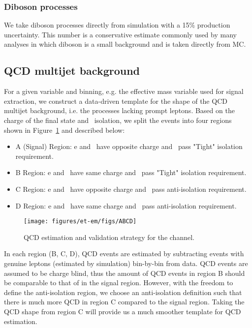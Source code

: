 \subsubsection{Diboson processes}
We take diboson processes directly from simulation with a 15\% production uncertainty. This number is a conservative estimate commonly used by many analyses in which diboson is a small background and is taken directly from MC.

    
\subsection{QCD multijet background}\label{sec:etau_qcd}
For a given variable and binning, e.g. the effective mass variable
used for signal extraction, we construct a data-driven template for
the shape of the QCD multijet background, i.e. the processes lacking
prompt leptons.  Based on the charge of the final state and \tauh ~isolation,
we split the events into four regions shown in Figure~\ref{fig:ABCD} and 
described below:
\begin{itemize}
  \item A (Signal) Region: e and \tauh ~have opposite charge and \tauh ~pass "Tight" isolation requirement.
  \item B Region: e and \tauh ~have same charge and ~\tauh pass "Tight" isolation requirement.
  \item C Region: e and \tauh ~have opposite charge and \tauh ~pass anti-isolation requirement.
  \item D Region: e and \tauh ~have same charge and \tauh ~pass anti-isolation requirement.
\end{itemize}

\begin{figure}[thbp!]\centering
  \texttt{[image: figures/et-em/figs/ABCD]}
  \caption{\label{fig:ABCD} QCD estimation and validation strategy for the \teth channel.}
\end{figure}
In each region (B, C, D), QCD events are estimated by subtracting events
with genuine leptons (estimated by simulation) bin-by-bin from data.
QCD events are assumed to be charge blind, thus the amount of QCD events in region B should be 
comparable to that of in the signal region. However, with the freedom to define the
anti-isolation region, we choose an anti-isolation definition such
that there is much more QCD in region C compared to the signal region. 
Taking the QCD shape from region C will provide us 
a much smoother template for QCD estimation.

